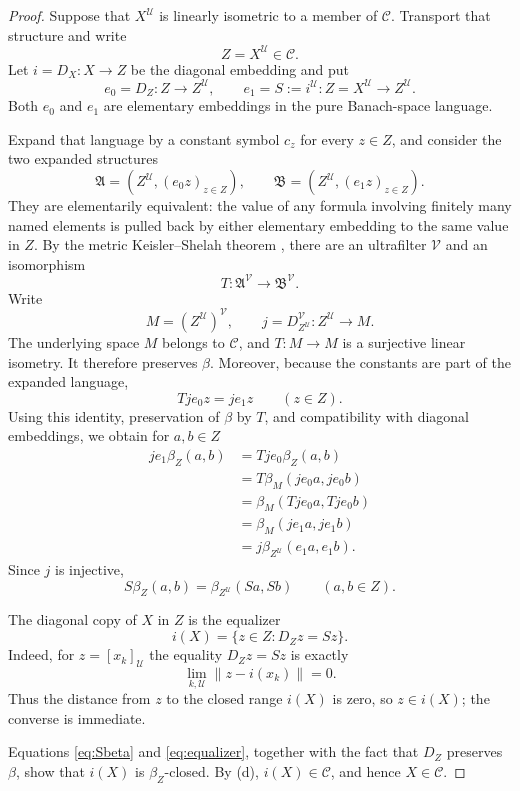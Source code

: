 \documentclass[11pt]{article}
\newcommand{\C}{\mathcal C}
\newcommand{\U}{\mathcal U}
\newcommand{\1}{\mathbf 1}
\theoremstyle{definition}
\theoremstyle{remark}
\begin{document}
\begin{proof}
Suppose that $X^{\U}$ is linearly isometric to a member of $\C$.  Transport
that structure and write
\[
                         Z=X^{\U}\in\C.
\]
Let $i=D_X:X\to Z$ be the diagonal embedding and put
\[
 e_0=D_Z:Z\longrightarrow Z^{\U},
 \qquad
 e_1=S:=i^{\U}:Z=X^{\U}\longrightarrow Z^{\U}.
\]
Both $e_0$ and $e_1$ are elementary embeddings in the pure Banach-space
language.

Expand that language by a constant symbol $c_z$ for every $z\in Z$, and
consider the two expanded structures
\[
 \mathfrak A=(Z^{\U},(e_0z)_{z\in Z}),
 \qquad
 \mathfrak B=(Z^{\U},(e_1z)_{z\in Z}).
\]
They are elementarily equivalent: the value of any formula involving
finitely many named elements is pulled back by either elementary embedding
to the same value in $Z$.  By the metric Keisler--Shelah theorem
\cite[Theorem~5.7]{BBHU2008}, there are an ultrafilter $\mathcal V$ and an
isomorphism
\[
       T:\mathfrak A^{\mathcal V}
          \longrightarrow \mathfrak B^{\mathcal V}.
\]
Write
\[
 M=(Z^{\U})^{\mathcal V},
 \qquad
 j=D_{Z^{\U}}^{\mathcal V}:Z^{\U}\longrightarrow M.
\]
The underlying space $M$ belongs to $\C$, and $T:M\to M$ is a surjective
linear isometry.  It therefore preserves $\beta$.  Moreover, because the
constants are part of the expanded language,
\[
                         Tje_0z=je_1z
                         \qquad(z\in Z).
\]
Using this identity, preservation of $\beta$ by $T$, and compatibility with
diagonal embeddings, we obtain for $a,b\in Z$
\begin{align*}
 je_1\beta_Z(a,b)
   &=Tje_0\beta_Z(a,b)\\
   &=T\beta_M(je_0a,je_0b)\\
   &=\beta_M(Tje_0a,Tje_0b)\\
   &=\beta_M(je_1a,je_1b)\\
   &=j\beta_{Z^{\U}}(e_1a,e_1b).
\end{align*}
Since $j$ is injective,
\begin{equation}
\label{eq:Sbeta}
       S\beta_Z(a,b)=\beta_{Z^{\U}}(Sa,Sb)
       \qquad(a,b\in Z).
\end{equation}

The diagonal copy of $X$ in $Z$ is the equalizer
\begin{equation}
\label{eq:equalizer}
       i(X)=\{z\in Z:D_Zz=Sz\}.
\end{equation}
Indeed, for $z=[x_k]_{\U}$ the equality $D_Zz=Sz$ is exactly
\[
       \lim_{k,\U}\|z-i(x_k)\|=0.
\]
Thus the distance from $z$ to the closed range $i(X)$ is zero, so
$z\in i(X)$; the converse is immediate.

Equations \eqref{eq:Sbeta} and \eqref{eq:equalizer}, together with the fact
that $D_Z$ preserves $\beta$, show that $i(X)$ is $\beta_Z$-closed.  By (d),
$i(X)\in\C$, and hence $X\in\C$.
\end{proof}
\end{document}

